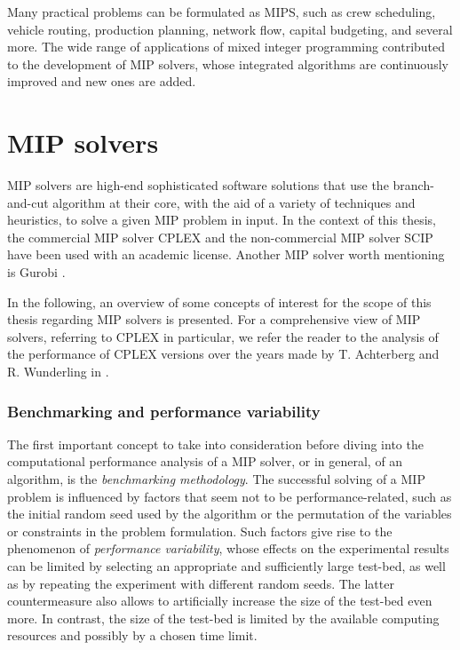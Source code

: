 \documentclass[a4paper,12pt,twoside]{scrbook}
\begin{document}
Many practical problems can be formulated as MIPS, such as crew scheduling, vehicle routing, production planning, network flow, capital budgeting, and several more. The wide range of applications of mixed integer programming contributed to the development of MIP solvers, whose integrated algorithms are continuously improved and new ones are added.

\section{MIP solvers} \label{sec:mipsolvers}
MIP solvers are high-end sophisticated software solutions that use the branch-and-cut algorithm at their core, with the aid of a variety of techniques and heuristics, to solve a given MIP problem in input. In the context of this thesis, the commercial MIP solver CPLEX \cite{cplex} and the non-commercial MIP solver SCIP \cite{scip} have been used with an academic license. Another MIP solver worth mentioning is Gurobi \cite{gurobi}. \par 

In the following, an overview of some concepts of interest for the scope of this thesis regarding MIP solvers is presented. For a comprehensive view of MIP solvers, referring to CPLEX in particular, we refer the reader to the analysis of the performance of CPLEX versions over the years made by T. Achterberg and R. Wunderling in \cite{achterberg2013}. \par

\subsubsection{Benchmarking and performance variability}
The first important concept to take into consideration before diving into the computational performance analysis of a MIP solver, or in general, of an algorithm, is the \textit{benchmarking methodology}. The successful solving of a MIP problem is influenced by factors that seem not to be performance-related, such as the initial random seed used by the algorithm or the permutation of the variables or constraints in the problem formulation. Such factors give rise to the phenomenon of \textit{performance variability}, whose effects on the experimental results can be limited by selecting an appropriate and sufficiently large test-bed, as well as by repeating the experiment with different random seeds. The latter countermeasure also allows to artificially increase the size of the test-bed even more. In contrast, the size of the test-bed is limited by the available computing resources and possibly by a chosen time limit. \par 
\end{document}
